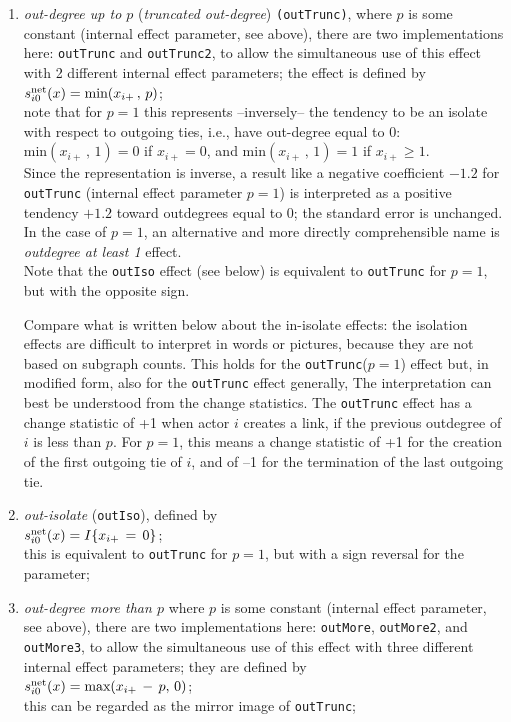 \documentclass[a4paper,fleqn,11pt]{article}
\newcommand{\+}{\, + \,}
\newcommand{\vit}{\theenumi}
\begin{document}
\begin{enumerate}
 \item {\em out-degree up to $p$} (\emph{truncated out-degree}) \texttt{(outTrunc)},
 where $p$ is some constant
 (internal effect parameter, see above),  there are two implementations here:
 \texttt{outTrunc} and \texttt{outTrunc2}, to allow the simultaneous use of this
 effect with 2 different internal effect parameters; the effect is
 defined by  \\
 $s^{\rm net}_{i\vit}(x) = \text{min}(x_{i+}\,,\, p)$;\\
 note that for $p=1$ this represents --inversely-- the tendency to be an isolate
 with respect to outgoing ties, i.e., have out-degree equal to 0:
 $ \text{min}(x_{i+}\,,\, 1) = 0$ if $x_{i+} = 0$, and
 $ \text{min}(x_{i+}\,,\, 1) = 1$ if $x_{i+} \geq 1$.\\
 Since the representation is inverse, a result like a negative coefficient
 $ -1.2$ for \texttt{outTrunc} (internal effect parameter $p=1$) is interpreted
 as a positive tendency $+1.2$ toward outdegrees equal to 0; the standard
 error is unchanged. In the case of $p=1$, an alternative and more directly
 comprehensible name is \emph{outdegree at least 1} effect.\\
 Note that the \texttt{outIso} effect (see below) is equivalent
 to \texttt{outTrunc} for $p=1$, but with the opposite sign.

 Compare what is written below about the in-isolate effects:
     the isolation effects are difficult to interpret in words or pictures,
     because they are not based on subgraph counts.
 This holds for the \texttt{outTrunc}($p=1$) effect but, in modified form,
 also for the \texttt{outTrunc} effect generally,
 The interpretation can best be understood from the change statistics.
 The \texttt{outTrunc} effect has a change statistic of +1 when actor $i$
 creates a link, if the previous outdegree of $i$ is less than $p$.
 For $p=1$, this means a change statistic of +1 for the creation of the
 first outgoing tie of $i$, and of --1 for the termination of the last outgoing tie.

 \item {\em out-isolate} (\texttt{outIso}), defined by \\
 $s^{\rm net}_{i\vit}(x) = I\{x_{i+} \,=\,  0\}$;\\
 this is equivalent to \texttt{outTrunc} for $p=1$,
 but with a sign reversal for the parameter;


 \item {\em out-degree more than $p$} where $p$ is some constant
 (internal effect parameter, see above),
  there are two implementations here:
 \texttt{outMore}, \texttt{outMore2}, and \texttt{outMore3},
 to allow the simultaneous use of this
 effect with three different internal effect parameters;
 they are defined by \\
 $s^{\rm net}_{i\vit}(x) = \text{max}(x_{i+}\,-\, p, \, 0)$;\\
 this can be regarded as the mirror image of \texttt{outTrunc};


\end{enumerate}
\end{document}
